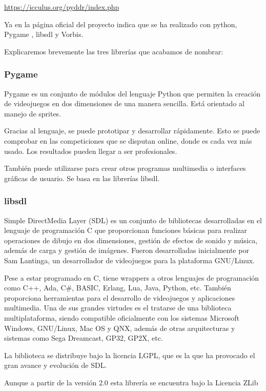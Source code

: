 \documentclass[a4paper,11pt,oneside]{book}
\begin{document}
\url{https://icculus.org/pyddr/index.php}

Ya en la página oficial del proyecto indica que se ha realizado con python, Pygame , libsdl y Vorbis.

Explicaremos brevemente las tres librerías que acabamos de nombrar:

\subsubsection{Pygame}

Pygame es un conjunto de módulos del lenguaje Python que permiten la creación de videojuegos en dos dimensiones de una manera sencilla.
Está orientado al manejo de sprites.

Gracias al lenguaje, se puede prototipar y desarrollar rápidamente. Esto se puede comprobar en las competiciones que se disputan online, donde es cada vez más usado.
Los resultados pueden llegar a ser profesionales.

También puede utilizarse para crear otros programas multimedia o interfaces gráficas de usuario.
Se basa en las librerías libsdl.

\subsubsection{libsdl} 

Simple DirectMedia Layer (SDL) es un conjunto de bibliotecas desarrolladas en el lenguaje de programación C que proporcionan funciones básicas para realizar operaciones de dibujo en dos dimensiones, gestión de efectos de sonido y música, además de carga y gestión de imágenes. Fueron desarrolladas inicialmente por Sam Lantinga, un desarrollador de videojuegos para la plataforma GNU/Linux.

Pese a estar programado en C, tiene wrappers a otros lenguajes de programación como C++, Ada, C\#, BASIC, Erlang, Lua, Java, Python, etc. También proporciona herramientas para el desarrollo de videojuegos y aplicaciones multimedia. Una de sus grandes virtudes es el tratarse de una biblioteca multiplataforma, siendo compatible oficialmente con los sistemas Microsoft Windows, GNU/Linux, Mac OS y QNX, además de otras arquitecturas y sistemas como Sega Dreamcast, GP32, GP2X, etc.

La biblioteca se distribuye bajo la licencia LGPL, que es la que ha provocado el gran avance y evolución de SDL.

Aunque a partir de la versión 2.0 esta librería se encuentra bajo la Licencia ZLib
\end{document}
